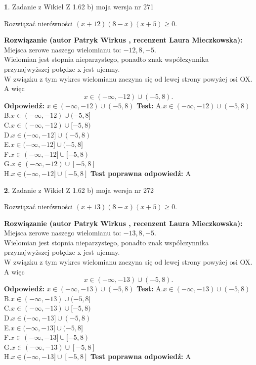 \documentclass[12pt, a4paper]{article}
\theoremstyle{definition} %
\newtheorem{zad}{}
\newcommand{\zadStart}[1]{\begin{zad}#1\newline}
\newcommand{\zadStop}{\end{zad}}
\newcommand{\rozwStart}[2]{\noindent \textbf{Rozwiązanie (autor #1 , recenzent #2): }\newline}
\newcommand{\rozwStop}{\newline}
\newcommand{\odpStart}{\noindent \textbf{Odpowiedź:}\newline}
\newcommand{\odpStop}{\newline}
\newcommand{\testStart}{\noindent \textbf{Test:}\newline}
\newcommand{\testStop}{\newline}
\newcommand{\kluczStart}{\noindent \textbf{Test poprawna odpowiedź:}\newline}
\newcommand{\kluczStop}{\newline}
\begin{document}
\zadStart{Zadanie z Wikieł Z 1.62 b) moja wersja nr 271}

Rozwiązać nierówności $(x+12)(8-x)(x+5)\ge0$.
\zadStop
\rozwStart{Patryk Wirkus}{Laura Mieczkowska}
Miejsca zerowe naszego wielomianu to: $-12, 8, -5$.\\
Wielomian jest stopnia nieparzystego, ponadto znak współczynnika przy\linebreak najwyższej potędze x jest ujemny.\\ W związku z tym wykres wielomianu zaczyna się od lewej strony powyżej osi OX. A więc $$x \in (-\infty,-12) \cup (-5,8).$$
\rozwStop
\odpStart
$x \in (-\infty,-12) \cup (-5,8)$
\odpStop
\testStart
A.$x \in (-\infty,-12) \cup (-5,8)$\\
B.$x \in (-\infty,-12) \cup (-5,8]$\\
C.$x \in (-\infty,-12) \cup [-5,8)$\\
D.$x \in (-\infty,-12] \cup (-5,8)$\\
E.$x \in (-\infty,-12] \cup (-5,8]$\\
F.$x \in (-\infty,-12] \cup [-5,8)$\\
G.$x \in (-\infty,-12) \cup [-5,8]$\\
H.$x \in (-\infty,-12] \cup [-5,8]$
\testStop
\kluczStart
A
\kluczStop



\zadStart{Zadanie z Wikieł Z 1.62 b) moja wersja nr 272}

Rozwiązać nierówności $(x+13)(8-x)(x+5)\ge0$.
\zadStop
\rozwStart{Patryk Wirkus}{Laura Mieczkowska}
Miejsca zerowe naszego wielomianu to: $-13, 8, -5$.\\
Wielomian jest stopnia nieparzystego, ponadto znak współczynnika przy\linebreak najwyższej potędze x jest ujemny.\\ W związku z tym wykres wielomianu zaczyna się od lewej strony powyżej osi OX. A więc $$x \in (-\infty,-13) \cup (-5,8).$$
\rozwStop
\odpStart
$x \in (-\infty,-13) \cup (-5,8)$
\odpStop
\testStart
A.$x \in (-\infty,-13) \cup (-5,8)$\\
B.$x \in (-\infty,-13) \cup (-5,8]$\\
C.$x \in (-\infty,-13) \cup [-5,8)$\\
D.$x \in (-\infty,-13] \cup (-5,8)$\\
E.$x \in (-\infty,-13] \cup (-5,8]$\\
F.$x \in (-\infty,-13] \cup [-5,8)$\\
G.$x \in (-\infty,-13) \cup [-5,8]$\\
H.$x \in (-\infty,-13] \cup [-5,8]$
\testStop
\kluczStart
A
\kluczStop
\end{document}
